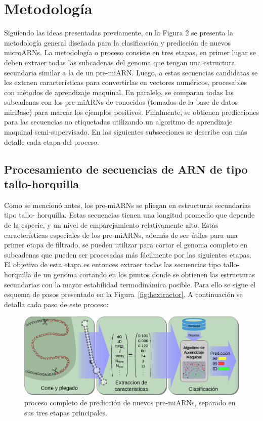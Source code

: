 \chapter{Metodología}
Siguiendo las ideas presentadas previamente, en la Figura 2 se presenta la metodología general diseñada para la clasificación y predicción de nuevos
microARNs. La metodología o proceso consiste en tres etapas, en primer lugar se deben extraer todas las subcadenas del genoma que tengan una estructura
secundaria similar a la de un pre-miARN. Luego, a estas secuencias candidatas se les extraen características para convertirlas en vectores numéricos,
procesables con métodos de aprendizaje maquinal. En paralelo, se comparan todas las subcadenas con los pre-miARNs de conocidos (tomados de la base de datos mirBase)
para marcar los ejemplos positivos. Finalmente, se obtienen predicciones para las secuencias no etiquetadas utilizando un algoritmo de aprendizaje maquinal
semi-supervisado. En las siguientes subsecciones se describe con más detalle cada etapa del proceso.

\section{Procesamiento de secuencias de ARN de tipo tallo-horquilla}
Como se mencionó antes, los pre-miARNs se pliegan en estructuras secundarias tipo tallo- horquilla. Estas secuencias tienen una longitud promedio que depende
de la especie, y un nivel de emparejamiento relativamente alto. Estas características especiales de los pre-miARNs, además de ser útiles para una primer
etapa de filtrado, se pueden utilizar para cortar el genoma completo en subcadenas que pueden ser procesadas más fácilmente por las siguientes etapas. El
objetivo de esta etapa es entonces extraer todas las secuencias tipo tallo-horquilla de un genoma cortando en los puntos donde se obtienen las estructuras
secundarias con la mayor estabilidad termodinámica posible. Para ello se sigue el esquema de pasos presentado en la Figura~\ref{fig:hextractor}. A
continuación se detalla cada paso de este proceso:

\begin{figure}[h]
	\centering
	\includegraphics[width=\textwidth]{fig/diagrama.eps}
	\caption[Etapas de la predicción de microARN]{proceso completo de predicción de nuevos pre-miARNs, separado en sus tres etapas principales.}
	\label{fig:esquema}
\end{figure}

